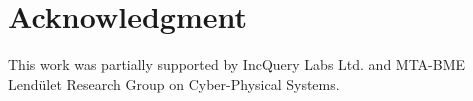 \documentclass[conference]{IEEEtran}
\begin{document}






\section*{Acknowledgment}
This work was partially supported by IncQuery Labs Ltd. and MTA-BME Lend\"ulet Research Group on Cyber-Physical Systems.







%
%
%








\end{document}
